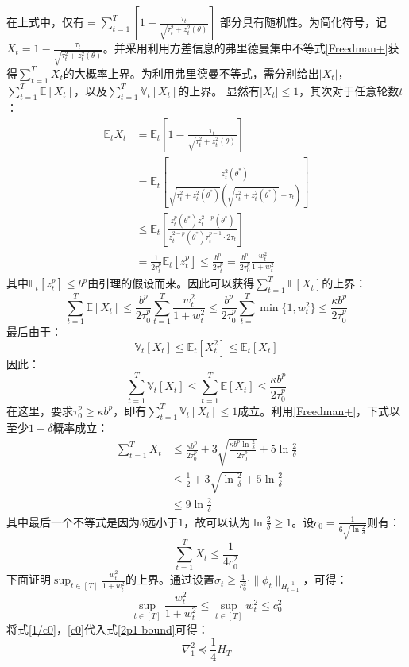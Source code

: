 \documentclass[UTF8,a4paper,10.5pt]{ctexart}
\newcommand{\E}{\mathbb{E}}
\newcommand{\V}{\mathbb{V}}
\begin{document}
在上式中，仅有$= \sum_{t=1}^T\left[1-\frac{\tau_t}{\sqrt{\tau_t^2 + z_t^2(\theta)}}\right]$ 部分具有随机性。为简化符号，记$X_t =1-\frac{\tau_t}{\sqrt{\tau_t^2 + z_t^2(\theta)}}$。并采用利用方差信息的弗里德曼集中不等式\ref{Freedman+}获得$\sum_{t=1}^TX_t$的大概率上界。为利用弗里德曼不等式，需分别给出$|X_t|$，$\sum_{t=1}^T\E[X_t]$，以及$\sum_{t=1}^{T}\V_t[X_t]$的上界。
显然有$|X_t|\leq 1$，其次对于任意轮数$t$：
\begin{align*}
	\E_tX_t &= \E_t \left[1-\frac{\tau_t}{\sqrt{\tau_t^2 + z_t^2(\theta)}}\right] \\
	&  = \E_t \left[\frac{z_t^2(\theta^*)}{\sqrt{\tau_t^2+z_t^2(\theta^*)}(\sqrt{\tau_t^2+z_t^2(\theta^*)} + \tau_t)}\right] \\
	& \leq \E_t \left[\frac{z_t^p(\theta^*)z_t^{2-p}(\theta^*)}{z_t^{2-p}(\theta^*) \tau_t^{p-1}\cdot 2\tau_t}\right] \\ 
	& = \frac{1}{2\tau_t^p}\E_t[z_t^{p}] \leq \frac{b^p}{2\tau_t^p} = \frac{b^p}{2\tau_0^p}\frac{w_t^2}{1+w_t^2}
\end{align*}
其中$\E_t[z_t^p]\leq b^p$由引理的假设而来。因此可以获得$\sum_{t=1}^T\E[X_t]$的上界：
\begin{equation}
	\sum_{t=1}^T\E[X_t] \leq \frac{b^p}{2\tau_0^p} \sum_{t=1}^{T} \frac{w_t^2}{1+w_t^2} \leq \frac{b^p}{2\tau_0^p} \sum_{t=}^{T}\min \{1,w_t^2\}\leq \frac{\kappa b^p}{2\tau_0^p}
\end{equation}
最后由于：
\begin{equation*}
	\V_t[X_t] \leq \E_t[X_t^2]\leq \E_t[X_t] 
\end{equation*}
因此：
\begin{equation*}
	\sum_{t=1}^{T}\V_t[X_t] \leq \sum_{t=1}^T\E[X_t] \leq \frac{\kappa b^p}{2\tau_0^p}
\end{equation*}
在这里，要求$\tau_0^p\geq \kappa b^p$，即有$\sum_{t=1}^{T}\V_t[X_t]\leq 1$成立。利用\ref{Freedman+}，下式以至少$1-\delta$概率成立：
\begin{align*}
	\sum_{t=1}^T X_t &\leq \frac{\kappa b^p}{2\tau_0^p} + 3\sqrt{\frac{\kappa b^p \ln\frac{2}{\delta}}{2\tau_0^p}} + 5\ln\frac{2}{\delta} \\ 
	& \leq \frac{1}{2} + 3 \sqrt{\ln\frac{2}{\delta}} + 5 \ln\frac{2}{\delta} \\
	& \leq 9\ln\frac{2}{\delta} 
\end{align*}
其中最后一个不等式是因为$\delta$远小于$1$，故可以认为$\ln\frac{2}{\delta}\geq 1$。设$c_0=\frac{1}{6\sqrt{\ln\frac{2}{\delta}}}$则有：
\begin{equation}
	\sum_{t=1}^T X_t\leq \frac{1}{4c_0^2}
	\label{1/c0}
\end{equation}
下面证明$\sup_{t\in [T]} \frac{w_t^2}{1+w_t^2}$的上界。通过设置$\sigma_t\geq\frac{1}{c_0^2}\cdot \|\phi_t\|_{H_{t-1}^{-1}}$，可得：
\begin{equation}
	\sup_{t\in [T]} \frac{w_t^2}{1+w_t^2} \leq \sup_{t\in [T]}w_t^2 \leq c_0^2
	\label{c0}
\end{equation}
将式\ref{1/c0}，\ref{c0}代入式\ref{2p1 bound}可得：
\begin{equation}
	\nabla_1^2 \preceq \frac{1}{4}H_T
\end{equation}
\end{document}
